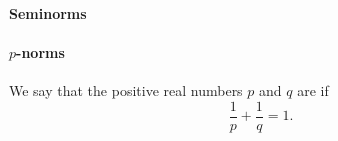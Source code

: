 \paragraph{Seminorms}

\begin{definition}\label{def:seminorm}
\end{definition}

\paragraph{\( p \)-norms}

\begin{definition}\label{def:conjugate_exponent}
  We say that the positive real numbers \( p \) and \( q \) are  if
  \begin{equation}\label{eq:def:conjugate_exponent}
    \frac 1 p + \frac 1 q = 1.
  \end{equation}
\end{definition}

